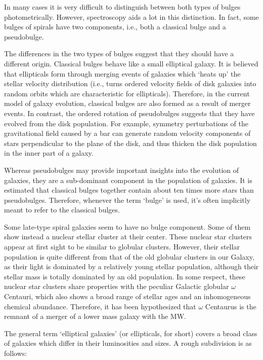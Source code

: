 \documentclass[a4paper,10pt]{article}
\begin{document}
{\noindent}In many cases it is very difficult to distinguish between both types of bulges photometrically. However, spectroscopy aids a lot in this distinction. In fact, some bulges of spirals have two components, i.e., both a classical bulge and a pseudobulge.

{\noindent}The differences in the two types of bulges suggest that they should have a different origin. Classical bulges behave like a small elliptical galaxy. It is believed that ellipticals form through merging events of galaxies which `heats up' the stellar velocity distribution (i.e., turns ordered velocity fields of disk galaxies into random orbits which are characteristic for ellipticals). Therefore, in the current model of galaxy evolution, classical bulges are also formed as a result of merger events. In contrast, the ordered rotation of pseudobulges suggests that they have evolved from the disk population. For example, symmetry perturbations of the gravitational field caused by a bar can generate random velocity components of stars perpendicular to the plane of the disk, and thus thicken the disk population in the inner part of a galaxy.

{\noindent}Whereas pseudobulges may provide important insights into the evolution of galaxies, they are a sub-dominant component in the population of galaxies. It is estimated that classical bulges together contain about ten times more stars than pseudobulges. Therefore, whenever the term `bulge' is used, it's often implicitly meant to refer to the classical bulges.

{\noindent}Some late-type spiral galaxies seem to have no bulge component. Some of them show instead a nuclear stellar cluster at their center. These nuclear star clusters appear at first sight to be similar to globular clusters. However, their stellar population is quite different from that of the old globular clusters in our Galaxy, as their light is dominated by a relatively young stellar population, although their stellar mass is totally dominated by an old population. In some respect, these nuclear star clusters share properties with the peculiar Galactic globular $\omega$ Centauri, which also shows a broad range of stellar ages and an inhomogeneous chemical abundance. Therefore, it has been hypothesized that $\omega$ Centaurus is the remnant of a merger of a lower mass galaxy with the MW.

{\noindent}The general term `elliptical galaxies' (or ellipticals, for short) covers a broad class of galaxies which differ in their luminosities and sizes. A rough subdivision is as follows:
\end{document}

